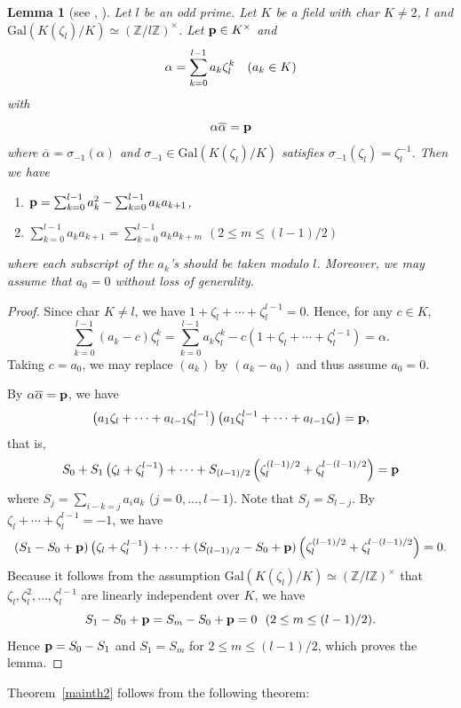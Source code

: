 \documentclass[a4paper, 11pt]{amsart}
\newcommand{\Z}{\mathbb Z}
\newcommand{\Gal}{\mathrm{Gal}}
\theoremstyle{plain}
\newtheorem{lem}[thm]{Lemma}
\theoremstyle{definition}
\numberwithin{equation}{section}
\begin{document}
\begin{lem} [{see \cite[Theorem~3.9.1]{BEW98}, \cite[Theorem~(i), (ii), page 186]{KR85a}}] \label{lem:BEW}
Let $l$ be an odd prime. 
Let $K$ be a field with char $K\neq 2$, $l$ and 
$\Gal(K(\zeta_l)/K)\simeq (\Z/l\Z)^{\times}$.  
Let ${\bf p}\in K^{\times}$ and
\[
\alpha=\sum_{k=0}^{l-1}a_k\zeta_l^k \quad (a_k \in K)\\
\]
with
\[
\alpha\overline{\alpha}= {\bf p}
\]
where $\overline{\alpha}=\sigma_{-1}(\alpha)$ and $\sigma_{-1} \in \Gal(K(\zeta_l)/K)$ 
satisfies $\sigma_{-1}(\zeta_l)=\zeta_l^{-1}$. 
Then we have
\begin{enumerate}
\item ${\bf p} =\sum_{k=0}^{l-1}a_k^2 - \sum_{k=0}^{l-1}a_ka_{k+1}$,
\item $\sum_{k=0}^{l-1}a_ka_{k+1}=\sum_{k=0}^{l-1}a_ka_{k+m}$ $(2\leq m\leq (l-1)/2)$ 
\end{enumerate}
where each subscript of the $a_k$'s should be taken modulo $l$. 
Moreover, we may assume that $a_0=0$ without loss of generality.
\end{lem}
\begin{proof}
Since char $K\neq l$, we have $1+\zeta_l+\cdots+\zeta_l^{l-1}=0$.
Hence, for any $c\in K$,
\[
\sum_{k=0}^{l-1}(a_k-c)\zeta_l^k
=\sum_{k=0}^{l-1}a_k\zeta_l^k - c(1+\zeta_l+\cdots+\zeta_l^{l-1})
=\alpha.
\]
Taking $c=a_0$, we may replace $(a_k)$ by $(a_k-a_0)$ and thus assume $a_0=0$.

By $\alpha\overline{\alpha}= {\bf p}$, we have 
\[
\left( a_1\zeta_l +  \cdots +a_{l-1}\zeta_l^{l-1}\right) \left(a_1\zeta_l^{l-1} + \cdots + a_{l-1}\zeta_l\right) = {\bf p},
\]
that is,
\[
S_0 + S_1\left(\zeta_l + \zeta_l^{l-1}\right) +  \cdots + S_{(l-1)/2}\left(\zeta_l^{(l-1)/2} + \zeta_l^{l-(l-1)/2}\right)= {\bf p}
\]
where $S_j = \sum_{i-k=j}a_ia_{k}$ ($j=0,\ldots,l-1$).
Note that  $S_j =S_{l-j}$.
By $\zeta_l+\cdots+\zeta_l^{l-1}=-1$, we have
\[
(S_1 - S_0 + {\bf p})\left(\zeta_l + \zeta_l^{l-1}\right) + 
 \cdots + (S_{(l-1)/2} - S_0 + {\bf p})\left(\zeta_l^{(l-1)/2} + \zeta_l^{l-(l-1)/2}\right) = 0.
\]
Because it follows from the assumption 
$\Gal(K(\zeta_l)/K)\simeq (\Z/l\Z)^{\times}$ that 
$\zeta_l,\zeta_l^2, \dots, \zeta_l^{l-1}$ are linearly independent over $K$, 
we have
\[
S_1 - S_0 + {\bf p} = S_m - S_0 + {\bf p}=0\ \ (2\leq m\leq (l-1)/2).
\]
Hence ${\bf p}=S_0-S_1$ and $S_1=S_m$ for $2\le m\le (l-1)/2$, which proves the lemma.
\end{proof}

Theorem~\ref{mainth2} follows from the following theorem: 
\end{document}
